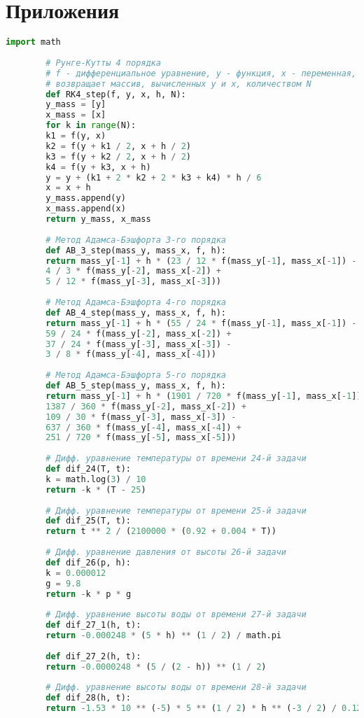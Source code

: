 \documentclass[a4paper,fleqn,14pt,titlepage]{extarticle}
\begin{document}
	\section{Приложения}
	\begin{lstlisting}[language=Python, caption=Файл <<methods.py>> с реализацией методов Рунге-Кутты и Адамса-Бэшфорта]
		import math
		
		# Рунге-Кутты 4 порядка
		# f - дифференциальное уравнение, y - функция, x - переменная, h - шаг, N - количество
		# возвращает массив, вычисленных y и x, количеством N
		def RK4_step(f, y, x, h, N):
		y_mass = [y]
		x_mass = [x]
		for k in range(N):
		k1 = f(y, x)
		k2 = f(y + k1 / 2, x + h / 2)
		k3 = f(y + k2 / 2, x + h / 2)
		k4 = f(y + k3, x + h)
		y = y + (k1 + 2 * k2 + 2 * k3 + k4) * h / 6
		x = x + h
		y_mass.append(y)
		x_mass.append(x)
		return y_mass, x_mass
		
		# Метод Адамса-Бэшфорта 3-го порядка
		def AB_3_step(mass_y, mass_x, f, h):
		return mass_y[-1] + h * (23 / 12 * f(mass_y[-1], mass_x[-1]) -
		4 / 3 * f(mass_y[-2], mass_x[-2]) +
		5 / 12 * f(mass_y[-3], mass_x[-3]))
		
		# Метод Адамса-Бэшфорта 4-го порядка
		def AB_4_step(mass_y, mass_x, f, h):
		return mass_y[-1] + h * (55 / 24 * f(mass_y[-1], mass_x[-1]) -
		59 / 24 * f(mass_y[-2], mass_x[-2]) +
		37 / 24 * f(mass_y[-3], mass_x[-3]) -
		3 / 8 * f(mass_y[-4], mass_x[-4]))
		
		# Метод Адамса-Бэшфорта 5-го порядка
		def AB_5_step(mass_y, mass_x, f, h):
		return mass_y[-1] + h * (1901 / 720 * f(mass_y[-1], mass_x[-1]) -
		1387 / 360 * f(mass_y[-2], mass_x[-2]) +
		109 / 30 * f(mass_y[-3], mass_x[-3]) -
		637 / 360 * f(mass_y[-4], mass_x[-4]) +
		251 / 720 * f(mass_y[-5], mass_x[-5]))
		
		# Дифф. уравнение температуры от времени 24-й задачи
		def dif_24(T, t):
		k = math.log(3) / 10
		return -k * (T - 25)
		
		# Дифф. уравнение температуры от времени 25-й задачи
		def dif_25(T, t):
		return t ** 2 / (2100000 * (0.92 + 0.004 * T))
		
		# Дифф. уравнение давления от высоты 26-й задачи
		def dif_26(p, h):
		k = 0.000012
		g = 9.8
		return -k * p * g
		
		# Дифф. уравнение высоты воды от времени 27-й задачи
		def dif_27_1(h, t):
		return -0.000248 * (5 * h) ** (1 / 2) / math.pi
		
		def dif_27_2(h, t):
		return -0.0000248 * (5 / (2 - h)) ** (1 / 2)
		
		# Дифф. уравнение высоты воды от времени 28-й задачи
		def dif_28(h, t):
		return -1.53 * 10 ** (-5) * 5 ** (1 / 2) * h ** (-3 / 2) / 0.1296
	\end{lstlisting}
\end{document}

